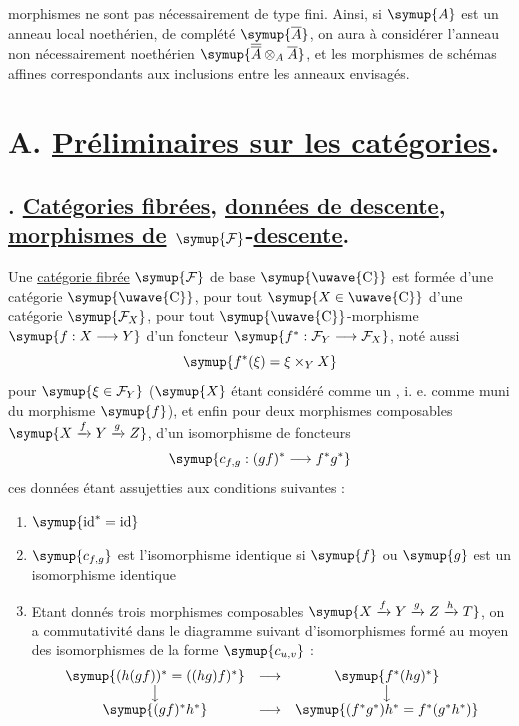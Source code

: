 morphismes ne sont pas nécessairement de type fini. Ainsi, si $\symup{A}$ est un anneau
local noethérien, de complété $\symup{\overline A}$, on aura à considérer l'anneau non nécessairement
noethérien $\symup{\overline{\overline A}\otimes_A\overline A}$, et les morphismes de schémas affines
correspondants aux inclusions entre les anneaux envisagés.

\section*{\normalfont A. \uline{Préliminaires sur les catégories}.}

\subsection*{. \uline{Catégories fibrées}, \uline{données de descente}, \uline{morphismes de} $\symup{\mathcal F}$-\uline{descente}.}

 Une \uline{catégorie fibrée} $\symup{\mathcal F}$ de base
$\symup{\text{\uwave{C}}}$ est formée d'une catégorie $\symup{\text{\uwave{C}}}$, pour tout
$\symup{X\in\text{\uwave{C}}}$ d'une catégorie $\symup{\mathcal F_X}$, pour tout
$\symup{\text{\uwave{C}}}$-morphisme $\symup{f:X\longrightarrow Y}$ d'un foncteur
$\symup{f^*:\mathcal F_Y\longrightarrow\mathcal F_X}$, noté aussi
\[
  \symup{f^*(\xi)=\xi\times_Y X}
\]
pour $\symup{\xi\in\mathcal F_Y}$ ($\symup{X}$ étant considéré comme un , i. e. comme muni du morphisme $\symup{f}$), et enfin pour deux morphismes composables
$\symup{X\xrightarrow{f}Y\xrightarrow{g}Z}$, d'un isomorphisme de foncteurs
\[
  \symup{c_{f,g}:(gf)^*\longrightarrow f^*g^*}
\]
ces données étant assujetties aux conditions suivantes :

\begin{enumerate}
\item[\textnormal{(i)}] $\symup{\operatorname{id}^*=\operatorname{id}}$
\item[\textnormal{(ii)}] $\symup{c_{f,g}}$ est l'isomorphisme identique si $\symup{f}$ ou $\symup{g}$ est un
isomorphisme identique
\item[\textnormal{(iii)}] Etant donnés trois morphismes composables
$\symup{X\xrightarrow{f}Y\xrightarrow{g}Z\xrightarrow{h}T}$, on a commutativité dans
le diagramme suivant d'isomorphismes formé au moyen des isomorphismes de la
forme $\symup{c_{u,v}}$ :
\[
\begin{array}{ccc}
  \symup{(h(gf))^*=((hg)f)^*} & \longrightarrow & \symup{f^*(hg)^*} \\
  \big\downarrow && \big\downarrow \\
  \symup{(gf)^*h^*} & \longrightarrow & \symup{(f^*g^*)h^*=f^*(g^*h^*)}
\end{array}
\]
\end{enumerate}

